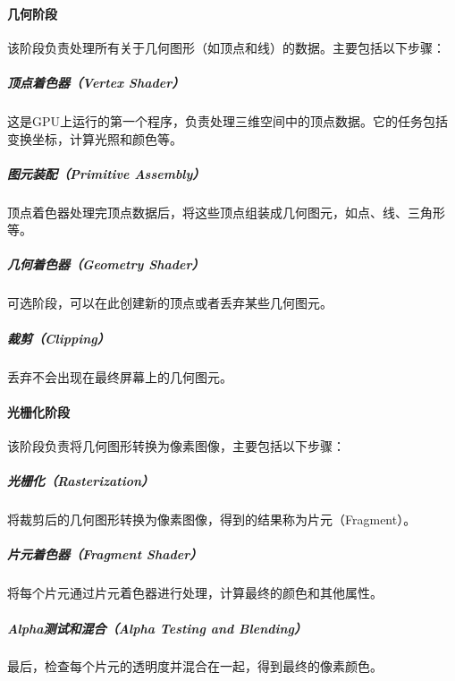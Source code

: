 \paragraph{几何阶段}

\par 该阶段负责处理所有关于几何图形（如顶点和线）的数据。主要包括以下步骤：

\subparagraph{顶点着色器（Vertex Shader）}
\par 这是GPU上运行的第一个程序，负责处理三维空间中的顶点数据。它的任务包括变换坐标，计算光照和颜色等。

\subparagraph{图元装配（Primitive Assembly）}
\par 顶点着色器处理完顶点数据后，将这些顶点组装成几何图元，如点、线、三角形等。

\subparagraph{几何着色器（Geometry Shader）}
\par 可选阶段，可以在此创建新的顶点或者丢弃某些几何图元。

\subparagraph{裁剪（Clipping）}
\par 丢弃不会出现在最终屏幕上的几何图元。

\paragraph{光栅化阶段}
\par 该阶段负责将几何图形转换为像素图像，主要包括以下步骤：

\subparagraph{光栅化（Rasterization）}
\par 将裁剪后的几何图形转换为像素图像，得到的结果称为片元（Fragment）。

\subparagraph{片元着色器（Fragment Shader）}
\par 将每个片元通过片元着色器进行处理，计算最终的颜色和其他属性。

\subparagraph{Alpha测试和混合（Alpha Testing and Blending）}
\par 最后，检查每个片元的透明度并混合在一起，得到最终的像素颜色。